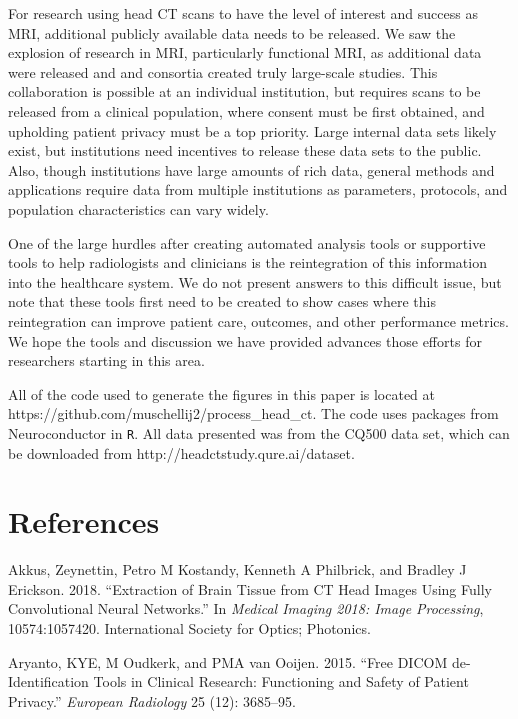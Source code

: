 \documentclass[]{elsarticle} %
\begin{document}
For research using head CT scans to have the level of interest and success as MRI, additional publicly available data needs to be released. We saw the explosion of research in MRI, particularly functional MRI, as additional data were released and and consortia created truly large-scale studies. This collaboration is possible at an individual institution, but requires scans to be released from a clinical population, where consent must be first obtained, and upholding patient privacy must be a top priority. Large internal data sets likely exist, but institutions need incentives to release these data sets to the public. Also, though institutions have large amounts of rich data, general methods and applications require data from multiple institutions as parameters, protocols, and population characteristics can vary widely.

One of the large hurdles after creating automated analysis tools or supportive tools to help radiologists and clinicians is the reintegration of this information into the healthcare system. We do not present answers to this difficult issue, but note that these tools first need to be created to show cases where this reintegration can improve patient care, outcomes, and other performance metrics. We hope the tools and discussion we have provided advances those efforts for researchers starting in this area.

All of the code used to generate the figures in this paper is located at https://github.com/muschellij2/process\_head\_ct. The code uses packages from Neuroconductor in \texttt{R}. All data presented was from the CQ500 data set, which can be downloaded from http://headctstudy.qure.ai/dataset.

\hypertarget{references}{%
\section*{References}\label{references}}

\hypertarget{refs}{}
\leavevmode\hypertarget{ref-ct_bet}{}%
Akkus, Zeynettin, Petro M Kostandy, Kenneth A Philbrick, and Bradley J Erickson. 2018. ``Extraction of Brain Tissue from CT Head Images Using Fully Convolutional Neural Networks.'' In \emph{Medical Imaging 2018: Image Processing}, 10574:1057420. International Society for Optics; Photonics.

\leavevmode\hypertarget{ref-aryanto2015free}{}%
Aryanto, KYE, M Oudkerk, and PMA van Ooijen. 2015. ``Free DICOM de-Identification Tools in Clinical Research: Functioning and Safety of Patient Privacy.'' \emph{European Radiology} 25 (12): 3685--95.
\end{document}
